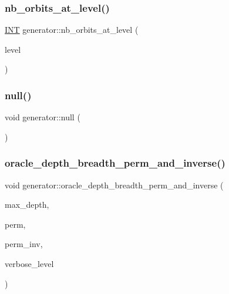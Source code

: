 \mbox{\label{classgenerator_a020f3d8378448310d044a4a24fadf301}} 
\subsubsection{\texorpdfstring{nb\+\_\+orbits\+\_\+at\+\_\+level()}{nb\_orbits\_at\_level()}}
{\footnotesize\ttfamily \mbox{\hyperlink{galois_8h_a09fddde158a3a20bd2dcadb609de11dc}{I\+NT}} generator\+::nb\+\_\+orbits\+\_\+at\+\_\+level (\begin{DoxyParamCaption}\item[{\mbox{\hyperlink{galois_8h_a09fddde158a3a20bd2dcadb609de11dc}{I\+NT}}}]{level }\end{DoxyParamCaption})}

\mbox{\label{classgenerator_ab6f35c2e1b820b54363f03bb39eb36c5}} 
\subsubsection{\texorpdfstring{null()}{null()}}
{\footnotesize\ttfamily void generator\+::null (\begin{DoxyParamCaption}{ }\end{DoxyParamCaption})}

\mbox{\label{classgenerator_a74c9122858a1938da934cf16d41b37d8}} 
\subsubsection{\texorpdfstring{oracle\+\_\+depth\+\_\+breadth\+\_\+perm\+\_\+and\+\_\+inverse()}{oracle\_depth\_breadth\_perm\_and\_inverse()}}
{\footnotesize\ttfamily void generator\+::oracle\+\_\+depth\+\_\+breadth\+\_\+perm\+\_\+and\+\_\+inverse (\begin{DoxyParamCaption}\item[{\mbox{\hyperlink{galois_8h_a09fddde158a3a20bd2dcadb609de11dc}{I\+NT}}}]{max\+\_\+depth,  }\item[{\mbox{\hyperlink{galois_8h_a09fddde158a3a20bd2dcadb609de11dc}{I\+NT}} $\ast$\&}]{perm,  }\item[{\mbox{\hyperlink{galois_8h_a09fddde158a3a20bd2dcadb609de11dc}{I\+NT}} $\ast$\&}]{perm\+\_\+inv,  }\item[{\mbox{\hyperlink{galois_8h_a09fddde158a3a20bd2dcadb609de11dc}{I\+NT}}}]{verbose\+\_\+level }\end{DoxyParamCaption})}

